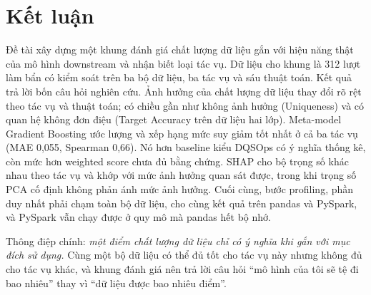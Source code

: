 \section{Kết luận}
\label{sec:ket-luan}

Đề tài xây dựng một khung đánh giá chất lượng dữ liệu gắn với hiệu năng thật của mô hình downstream và nhận biết loại tác vụ. Dữ liệu cho khung là 312 lượt làm bẩn có kiểm soát trên ba bộ dữ liệu, ba tác vụ và sáu thuật toán. Kết quả trả lời bốn câu hỏi nghiên cứu. Ảnh hưởng của chất lượng dữ liệu thay đổi rõ rệt theo tác vụ và thuật toán; có chiều gần như không ảnh hưởng (Uniqueness) và có quan hệ không đơn điệu (Target Accuracy trên dữ liệu hai lớp). Meta-model Gradient Boosting ước lượng và xếp hạng mức suy giảm tốt nhất ở cả ba tác vụ (MAE 0,055, Spearman 0,66). Nó hơn baseline kiểu DQSOps có ý nghĩa thống kê, còn mức hơn weighted score chưa đủ bằng chứng. SHAP cho bộ trọng số khác nhau theo tác vụ và khớp với mức ảnh hưởng quan sát được, trong khi trọng số PCA cố định không phản ánh mức ảnh hưởng. Cuối cùng, bước profiling, phần duy nhất phải chạm toàn bộ dữ liệu, cho cùng kết quả trên pandas và PySpark, và PySpark vẫn chạy được ở quy mô mà pandas hết bộ nhớ.

Thông điệp chính: \emph{một điểm chất lượng dữ liệu chỉ có ý nghĩa khi gắn với mục đích sử dụng.} Cùng một bộ dữ liệu có thể đủ tốt cho tác vụ này nhưng không đủ cho tác vụ khác, và khung đánh giá nên trả lời câu hỏi ``mô hình của tôi sẽ tệ đi bao nhiêu'' thay vì ``dữ liệu được bao nhiêu điểm''.
